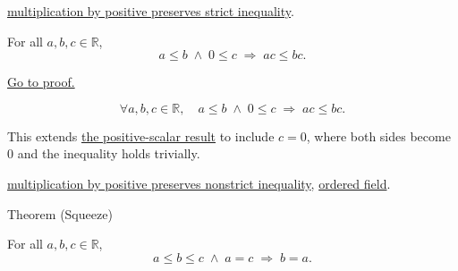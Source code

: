 \begin{dependencies}
\hyperref[thm:ineq-multiply-positive]{multiplication by positive preserves strict inequality}.
\end{dependencies}


\begin{theorem}
\label{thm:ineq-nonstrict-multiply-nonneg}
For all $a, b, c \in \mathbb{R}$,
\[
  a \le b \;\land\; 0 \le c \;\Rightarrow\; ac \le bc.
\]
\end{theorem}



\begin{remark*}[Proof]
\hyperref[prf:ineq-nonstrict-multiply-nonneg]{Go to proof.}
\end{remark*}

\begin{remark*}
\[
  \forall a, b, c \in \mathbb{R},\quad
  a \le b \;\land\; 0 \le c \;\Rightarrow\; ac \le bc.
\]
\end{remark*}

\begin{remark*}[Interpretation]
This extends
\hyperref[thm:ineq-nonstrict-multiply-positive]{the positive-scalar result}
to include $c = 0$, where both sides become $0$ and the inequality holds
trivially.
\end{remark*}

\begin{dependencies}
\hyperref[thm:ineq-nonstrict-multiply-positive]{multiplication by positive preserves nonstrict inequality},
\hyperref[def:real-ordered-field]{ordered field}.
\end{dependencies}


\begin{theorembox}{Theorem (Squeeze)}
\begin{theorem}[Squeeze]
\label{thm:ineq-squeeze}
For all $a, b, c \in \mathbb{R}$,
\[
  a \le b \le c \;\land\; a = c \;\Rightarrow\; b = a.
\]
\end{theorem}
\end{theorembox}



